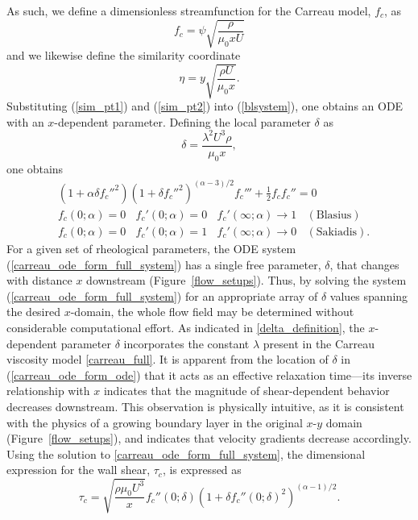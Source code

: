 \documentclass[lineno]{JFM-FLM_Au}
\begin{document}
As such, we define a dimensionless streamfunction for the Carreau model, $f_c$, as\begin{equation} f_c = \psi \sqrt{\dfrac{\rho}{\mu_0 x U}} \label{sim_pt1}\end{equation} and we likewise define the similarity coordinate \begin{equation} \eta = y \sqrt{\dfrac{\rho U}{\mu_0 x}}. \label{sim_pt2} \end{equation} Substituting (\ref{sim_pt1}) and (\ref{sim_pt2}) into (\ref{blsystem}), one obtains an ODE with an $x$-dependent parameter. Defining the local parameter $\delta$ as \begin{equation}
    \delta = \frac{\lambda^2 U^3 \rho}{\mu_0 x}, \label{delta_definition}
\end{equation}  one obtains \begin{subequations}
    \begin{align}
       & \left(1+\alpha\delta f_c''^2 \right) \left(1+\delta f_c''^2 \right)^{(\alpha-3)/2} f_c''' + \frac{1}{2}f_cf_c'' = 0 \label{carreau_ode_form_ode} \\ &f_c(0; \alpha)=0~~~~f_c'(0; \alpha)=0~~~~f_c'(\infty; \alpha) \to 1 ~~~~ (\mathrm{Blasius})\label{carreau_ode_form_blasius_bcs}  \\
    & f_c(0; \alpha)=0~~~~f_c'(0; \alpha)=1~~~~f_c'(\infty; \alpha) \to 0 ~~~~ (\mathrm{Sakiadis}). \label{carreau_ode_form_sakiadis_bcs}
    \end{align} \label{carreau_ode_form_full_system} \end{subequations}
\noindent For a given set of rheological parameters, the ODE system (\ref{carreau_ode_form_full_system}) has a single free parameter, $\delta$, that changes with distance $x$ downstream (Figure~\ref{flow_setups}). Thus, by solving the system (\ref{carreau_ode_form_full_system}) for an appropriate array of $\delta$ values spanning the desired $x$-domain, the whole flow field may be determined without considerable computational effort. As indicated in \eqref{delta_definition}, the $x$-dependent parameter $\delta$ incorporates the constant $\lambda$ present in the Carreau viscosity model \eqref{carreau_full}.  It is apparent from the location of $\delta$ in (\ref{carreau_ode_form_ode}) that it acts as an effective relaxation time---its inverse relationship with $x$ indicates that the magnitude of shear-dependent behavior decreases downstream.  This observation is physically intuitive, as it is consistent with the physics of a growing boundary layer in the original $x$-$y$ domain (Figure~\ref{flow_setups}), and indicates that velocity gradients decrease accordingly. Using the solution to \eqref{carreau_ode_form_full_system}, the dimensional expression for the wall shear, $\tau_{c}$, is expressed as \begin{equation}
    \tau_{c} = \sqrt{\dfrac{\rho  \mu_0U^3}{ x}}f_c''\left(0; \delta\right)\left(1 + \delta f_c''\left(0; \delta\right)^2  \right)^{(\alpha-1)/2} .\label{carreau_wall_shear_dimensional_expression}
\end{equation}
\end{document}
